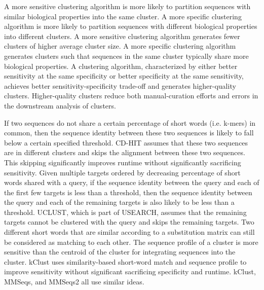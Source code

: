 \documentclass[11pt,letterpaper]{article}
\begin{document}
A more sensitive clustering algorithm is more likely to partition sequences with similar biological properties into the same cluster.
A more specific clustering algorithm is more likely to partition sequences with different biological properties into different clusters.
A more sensitive clustering algorithm generates fewer clusters of higher average cluster size.
A more specific clustering algorithm generates clusters such that sequences in the same cluster typically share more biological properties.
A clustering algorithm, characterized by either better sensitivity at the same specificity or better specificity at the same sensitivity, achieves better sensitivity-specificity trade-off and generates higher-quality clusters.
Higher-quality clusters reduce both manual-curation efforts and errors in the downstream analysis of clusters.

If two sequences do not share a certain percentage of short words (i.e. k-mers) in common, then the sequence identity between these two sequences is likely to fall below a certain specified threshold.
CD-HIT assumes that these two sequences are in different clusters and skips the alignment between these two sequences.
This skipping significantly improves runtime without significantly sacrificing sensitivity.
Given multiple targets ordered by decreasing percentage of short words shared with a query, if the sequence identity between the query and each of the first few targets is less than a threshold, then the sequence identity between the query and each of the remaining targets is also likely to be less than a threshold.
UCLUST, which is part of USEARCH, assumes that the remaining targets cannot be clustered with the query and skips the remaining targets.
Two different short words that are similar according to a substitution matrix can still be considered as matching to each other.
The sequence profile of a cluster is more sensitive than the centroid of the cluster for integrating sequences into the cluster.
kClust uses similarity-based short-word match and sequence profile to improve sensitivity without significant sacrificing specificity and runtime.
kClust, MMSeqs, and MMSeqs2 all use similar ideas.

\end{document}
